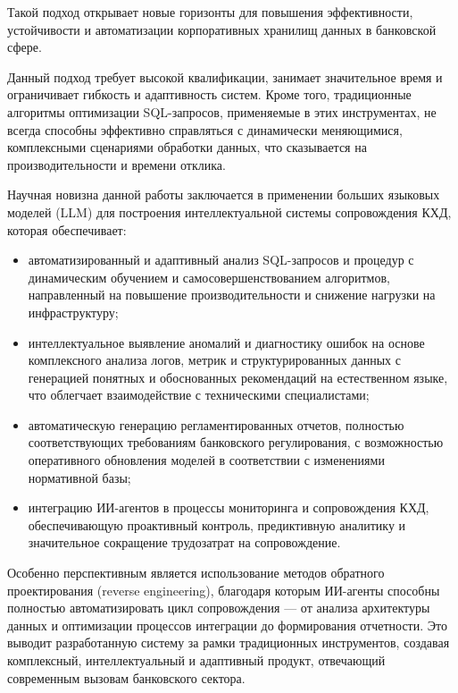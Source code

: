 Такой подход открывает новые горизонты для повышения эффективности, устойчивости и автоматизации корпоративных хранилищ данных в банковской сфере.

Данный подход требует высокой квалификации, занимает значительное время и ограничивает гибкость и адаптивность систем. Кроме того, традиционные алгоритмы оптимизации SQL-запросов, применяемые в этих инструментах, не всегда способны эффективно справляться с динамически меняющимися, комплексными сценариями обработки данных, что сказывается на производительности и времени отклика.

Научная новизна данной работы заключается в применении больших языковых моделей (LLM) для построения интеллектуальной системы сопровождения КХД, которая обеспечивает:
\begin{itemize}
    \item автоматизированный и адаптивный анализ SQL-запросов и процедур с динамическим обучением и самосовершенствованием алгоритмов, направленный на повышение производительности и снижение нагрузки на инфраструктуру;
    \item интеллектуальное выявление аномалий и диагностику ошибок на основе комплексного анализа логов, метрик и структурированных данных с генерацией понятных и обоснованных рекомендаций на естественном языке, что облегчает взаимодействие с техническими специалистами;
    \item автоматическую генерацию регламентированных отчетов, полностью соответствующих требованиям банковского регулирования, с возможностью оперативного обновления моделей в соответствии с изменениями нормативной базы;
    \item интеграцию ИИ-агентов в процессы мониторинга и сопровождения КХД, обеспечивающую проактивный контроль, предиктивную аналитику и значительное сокращение трудозатрат на сопровождение.
\end{itemize}

Особенно перспективным является использование методов обратного проектирования (reverse engineering), благодаря которым ИИ-агенты способны полностью автоматизировать цикл сопровождения — от анализа архитектуры данных и оптимизации процессов интеграции до формирования отчетности. Это выводит разработанную систему за рамки традиционных инструментов, создавая комплексный, интеллектуальный и адаптивный продукт, отвечающий современным вызовам банковского сектора.

